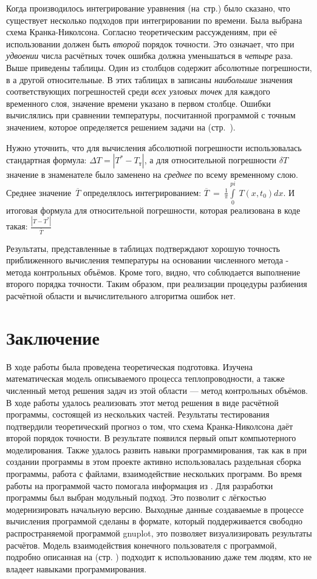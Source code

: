 \documentclass[oneside, final, 14pt]{report}
\begin{document}
Когда производилось интегрирование уравнения (на~стр.\pageref{integ_diffur}) было сказано, что существует несколько подходов при интегрировании по времени. Была выбрана схема Кранка-Николсона. Согласно теоретическим рассуждениям, при её использовании должен быть \emph{второй} порядок точности. Это означает, что при \emph{удвоении} числа расчётных точек ошибка должна уменьшаться в \emph{четыре} раза. Выше приведены таблицы. Один из столбцов содержит абсолютные погрешности, в а другой относительные. В этих таблицах в записаны \emph{наибольшие} значения соответствующих погрешностей среди \emph{всех узловых точек} для каждого временного слоя, значение времени указано в первом столбце. Ошибки вычислялись при сравнении температуры, посчитанной программой с точным значением, которое определяется решением задачи на (стр.~\pageref{test_task_page}).

Нужно уточнить, что для вычисления абсолютной погрешности использовалась стандартная формула: $\Delta T = |T^{*} - T_{т}|$, а для относительной погрешности $\delta T$ значение в знаменателе было заменено на \emph{среднее} по всему временному слою. Среднее значение~$\overline{T}$ определялось интегрированием: $\overline{T}\ =\ \frac{1}{\pi}\int\limits_{0}^{pi}\ T(x, t_0) dx$. И итоговая формула для относительной погрешности, которая реализована в коде такая: $\frac{|T - T^{*}|}{\overline{T}}$ 

Результаты, представленные в таблицах подтверждают хорошую точность приближенного вычисления температуры на основании численного метода - метода контрольных объёмов. Кроме того, видно, что соблюдается выполнение второго порядка точности. Таким образом, при реализации процедуры разбиения расчётной области и вычислительного алгоритма ошибок нет.

\chapter{Заключение}
В ходе работы была проведена теоретическая подготовка. Изучена математическая модель описываемого процесса теплопроводности, а также численный метод решения задач из этой области --- метод контрольных объёмов. В ходе работы удалось реализовать этот метод решения в виде расчётной программы, состоящей из нескольких частей. Результаты тестирования подтвердили теоретический прогноз о том, что схема Кранка-Николсона даёт второй порядок точности. В результате появился первый опыт компьютерного моделирования. Также удалось развить навыки программирования, так как в при создании программы в этом проекте активно использовалась раздельная сборка программы, работа с файлами, взаимодействие нескольких программ. Во время работы на программой часто помогала информация из \cite{bib:Stolyarov}. Для разработки программы был выбран модульный подход. Это позволит с лёгкостью модернизировать начальную версию. Выходные данные создаваемые в процессе вычисления программой сделаны в формате, который поддерживается свободно распространяемой программой gnuplot, это позволяет визуализировать результаты расчётов. Модель взаимодействия конечного пользователя с программой, подробно описанная на (стр. \pageref{page_model_user}) подходит к использованию даже тем людям, кто не владеет навыками программирования. 


\end{document}
